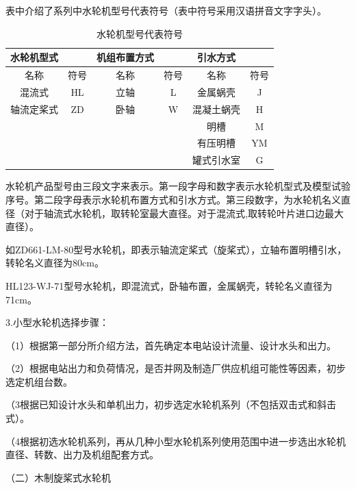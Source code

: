 \documentclass{ctexbook}
\begin{document}
表中介绍了系列中水轮机型号代表符号（表中符号采用汉语拼音文字字头）。
\begin{table}[htbp]
	\centering
	\caption{水轮机型号代表符号}
	\begin{tabular}{cccc|c|c|}
		\toprule
		\multicolumn{1}{|c|}{水轮机型式} & \multicolumn{1}{c|}{} & \multicolumn{1}{c|}{机组布置方式} &       & 引水方式  &  \\
		\midrule
		\multicolumn{1}{|c|}{名称} & \multicolumn{1}{c|}{符号} & \multicolumn{1}{c|}{名称} & 符号    & 名称    & 符号 \\
		\midrule
		\multicolumn{1}{|c|}{混流式} & \multicolumn{1}{c|}{HL} & \multicolumn{1}{c|}{立轴} & L     & 金属蜗壳  & J \\
		\midrule
		\multicolumn{1}{|c|}{轴流定桨式} & \multicolumn{1}{c|}{ZD} & \multicolumn{1}{c|}{卧轴} & W     & 混凝土蜗壳 & H \\
		\midrule
		&       &       &       & 明槽    & M \\
		\cmidrule{5-6}          &       &       &       & 有压明槽  & YM \\
		\cmidrule{5-6}          &       &       &       & 罐式引水室 & G \\
		\cmidrule{5-6}    \end{tabular}%
	\label{tab:shuilunjixinghao}%
\end{table}%



水轮机产品型号由三段文字来表示。第一段字母和数字表示水轮机型式及模型试验序号。第二段字母表示水轮机布置方式和引水方式。第三段数字，为水轮机名义直径（对于轴流式水轮机，取转轮室最大直径。对于混流式,取转轮叶片进口边最大直径）。

如ZD661-LM-80型号水轮机，即表示轴流定桨式（旋桨式），立轴布置明槽引水，转轮名义直径为80cm。

HL123-WJ-71型号水轮机，即混流式，卧轴布置，金属蜗壳，转轮名义直径为71cm。

3.小型水轮机选择步骤：

（1）根据第一部分所介绍方法，首先确定本电站设计流量、设计水头和出力。

（2）根据电站出力和负荷情况，是否并网及制造厂供应机组可能性等因素，初步选定机组台数。

（3根据已知设计水头和单机出力，初步选定水轮机系列（不包括双击式和斜击式）。

（4根据初选水轮机系列，再从几种小型水轮机系列使用范围中进一步选出水轮机直径、转数、出力及机组配套方式。

（二）木制旋桨式水轮机
\end{document}
